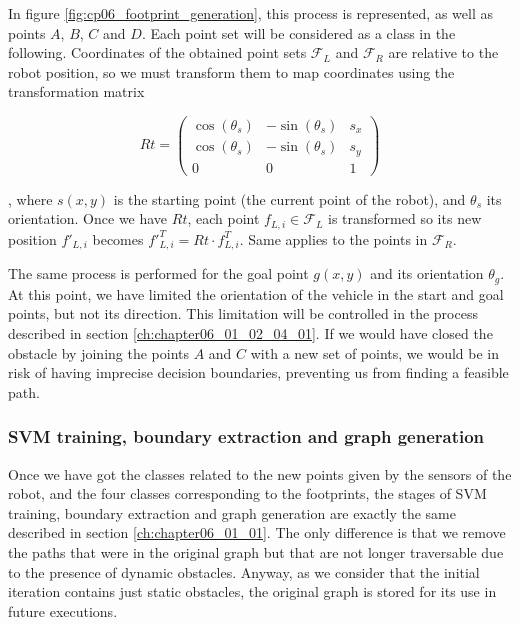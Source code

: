 In figure \ref{fig:cp06_footprint_generation}, this process is represented, as well as points $A$, $B$, $C$ and $D$. Each point set will be considered as a class in the following. Coordinates of the obtained point sets $\mathcal{F}_L$ and $\mathcal{F}_R$ are relative to the robot position, so we must transform them to map coordinates using the transformation matrix

\begin{equation}\label{eq:cp06_Rt_footprint}
 Rt = \left ( \begin{array}{ ccc }
  \cos(\theta_s) & -\sin(\theta_s) & s_x \\
  \cos(\theta_s) & -\sin(\theta_s) & s_y \\
  0 & 0 & 1
 \end{array} \right )
\end{equation}

, where $s(x,y)$ is the starting point (the current point of the robot), and $\theta_s$ its orientation. Once we have $Rt$, each point $f_{L,i} \in \mathcal{F}_L$ is transformed so its new position $f'_{L,i}$ becomes ${f'}_{L,i}^T = Rt \cdot f_{L,i}^T$. Same applies to the points in $\mathcal{F}_R$.

The same process is performed for the goal point $g(x,y)$ and its orientation $\theta_g$. At this point, we have limited the orientation of the vehicle in the start and goal points, but not its direction. This limitation will be controlled in the process described in section \ref{ch:chapter06_01_02_04_01}. If we would have closed the obstacle by joining the points $A$ and $C$ with a new set of points, we would be in  risk of having imprecise decision boundaries, preventing us from finding a feasible path.

\subsubsection{\ac{SVM} training, boundary extraction and graph generation}\label{ch:chapter06_01_02_03}

Once we have got the classes related to the new points given by the sensors of the robot, and the four classes corresponding to the footprints, the stages of \ac{SVM} training, boundary extraction and graph generation are exactly the same described in section \ref{ch:chapter06_01_01}. The only difference is that we remove the paths that were in the original graph but that are not longer traversable due to the presence of dynamic obstacles. Anyway, as we consider that the initial iteration contains just static obstacles, the original graph is stored for its use in future executions.

